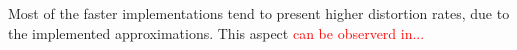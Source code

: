 Most of the faster implementations tend to present higher distortion rates, due to the implemented approximations. This aspect \textcolor{red}{can be observerd in...}


\clearpage
\printbibliography[heading=subbibliography]
